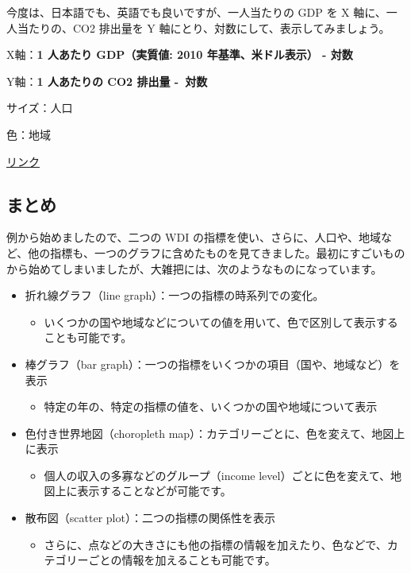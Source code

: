 \documentclass[
  xelatex, ja=standard]{bxjsbook}
\providecommand{\tightlist}{%
  \setlength{\itemsep}{0pt}\setlength{\parskip}{0pt}}
\theoremstyle{definition}
\theoremstyle{definition}
\theoremstyle{definition}
\theoremstyle{definition}
\theoremstyle{remark}
\begin{document}
今度は、日本語でも、英語でも良いですが、一人当たりの GDP を X 軸に、一人当たりの、CO2 排出量を Y 軸にとり、対数にして、表示してみましょう。

X軸：\textbf{1 人あたり GDP（実質値: 2010 年基準、米ドル表示） - 対数}

Y軸：\textbf{1 人あたりの CO2 排出量 -~対数}

サイズ：人口

色：地域

\href{https://www.google.com/publicdata/explore?ds=d5bncppjof8f9_\&ctype=b\&strail=false\&bcs=d\&nselm=s\&met_s=sp_pop_totl\&scale_s=lin\&ind_s=false\&dimp_c=country:region\&met_y=en_atm_co2e_pc\&scale_y=log\&ind_y=false\&met_x=ny_gdp_pcap_kd\&scale_x=log\&ind_x=false\&idim=country:JPN\&ifdim=country\&tunit=Y\&pit=1409929200000\&ind=false\&icfg\&iconSize=0.5}{リンク}

\hypertarget{ux307eux3068ux3081-2}{%
\subsection{まとめ}\label{ux307eux3068ux3081-2}}

例から始めましたので、二つの WDI の指標を使い、さらに、人口や、地域など、他の指標も、一つのグラフに含めたものを見てきました。最初にすごいものから始めてしまいましたが、大雑把には、次のようなものになっています。

\begin{itemize}
\item
  折れ線グラフ（line graph）：一つの指標の時系列での変化。

  \begin{itemize}
  \tightlist
  \item
    いくつかの国や地域などについての値を用いて、色で区別して表示することも可能です。
  \end{itemize}
\item
  棒グラフ（bar graph）：一つの指標をいくつかの項目（国や、地域など）を表示

  \begin{itemize}
  \tightlist
  \item
    特定の年の、特定の指標の値を、いくつかの国や地域について表示
  \end{itemize}
\item
  色付き世界地図（choropleth map）：カテゴリーごとに、色を変えて、地図上に表示

  \begin{itemize}
  \tightlist
  \item
    個人の収入の多寡などのグループ（income level）ごとに色を変えて、地図上に表示することなどが可能です。
  \end{itemize}
\item
  散布図（scatter plot）：二つの指標の関係性を表示

  \begin{itemize}
  \tightlist
  \item
    さらに、点などの大きさにも他の指標の情報を加えたり、色などで、カテゴリーごとの情報を加えることも可能です。
  \end{itemize}
\end{itemize}
\end{document}
